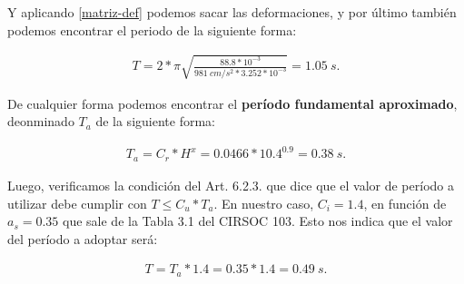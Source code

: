 \documentclass[../main.tex]{subfiles}
\begin{document}
Y aplicando \cref{matriz-def} podemos sacar las deformaciones, y por último también
podemos encontrar el periodo de la siguiente forma:

\begin{align*}
  T = 2*\pi \sqrt{\frac{88.8*10^{-3}}{\SI{981}{cm / s^2}*3.252*10^{-3}}} = \SI{1.05}{s} 
.\end{align*}

De cualquier forma podemos encontrar el \textbf{período fundamental aproximado},
deonminado $T_a$ de la siguiente forma:

\begin{align*}
  T_a = C_r * H^x = 0.0466 * 10.4^{0.9} = \SI{0.38}{s} 
.\end{align*}

Luego, verificamos la condición del Art. 6.2.3. que dice que el valor de período
a utilizar debe cumplir con $T \leq C_u * T_a$. En nuestro caso, $C_i = 1.4 $, 
en función de  $a_s = 0.35$ que sale de la Tabla 3.1 del CIRSOC 103. Esto nos indica
que el valor del período a adoptar será:

\begin{align*}
  T = T_a * 1.4 = 0.35 * 1.4 = \SI{0.49}{s}
.\end{align*}
\end{document}

